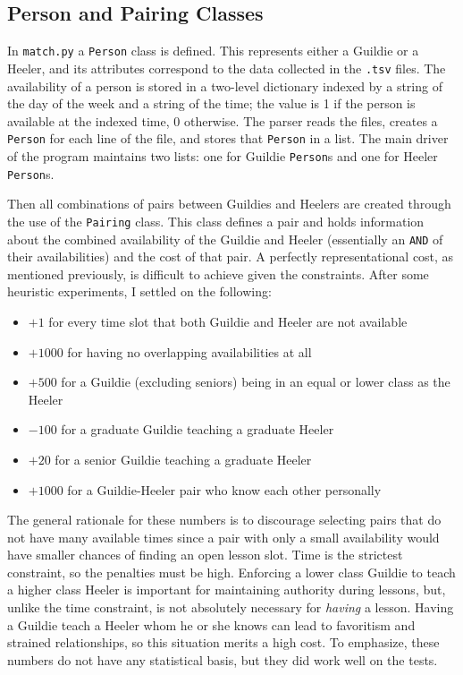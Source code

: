 \documentclass[letterpaper]{article}
\begin{document}
\subsection{Person and Pairing Classes}
In \texttt{match.py} a \texttt{Person} class is defined. This represents either a Guildie or a Heeler, and its
attributes correspond to the data collected in the \texttt{.tsv} files. The availability of a person is stored in
a two-level dictionary indexed by a string of the day of the week and a string of the time; the value is 1 if the person
is available at the indexed time, 0 otherwise. The parser reads the files, creates a
\texttt{Person} for each line of the file, and stores that \texttt{Person} in a list. The main driver of the program
maintains two lists: one for Guildie \texttt{Person}s and one for Heeler \texttt{Person}s.

Then all combinations of pairs between Guildies and Heelers are created through the use of the \texttt{Pairing} class. This class
defines a pair and holds information about the combined availability of the Guildie and Heeler (essentially an
\texttt{AND} of their availabilities) and the cost of that pair. A perfectly representational cost, as mentioned
previously, is difficult to achieve given the constraints. After some heuristic experiments, I settled on the following:

\begin{itemize}
    \item $+ 1$ for every time slot that both Guildie and Heeler are not available
    \item $+ 1000$ for having no overlapping availabilities at all
    \item $+ 500$ for a Guildie (excluding seniors) being in an equal or lower class as the Heeler
    \item $- 100$ for a graduate Guildie teaching a graduate Heeler
    \item $+ 20$ for a senior Guildie teaching a graduate Heeler
    \item $+ 1000$ for a Guildie-Heeler pair who know each other personally
\end{itemize}

The general rationale for these numbers is to discourage selecting pairs that do not have many available times since
a pair with only a small availability would have smaller chances of finding an open lesson slot. Time is the strictest
constraint, so the penalties must be high. Enforcing a lower class Guildie to teach a higher class Heeler is important
for maintaining authority during lessons, but, unlike the time constraint, is not absolutely necessary for
\textit{having} a lesson. Having a Guildie teach a Heeler whom he or she knows can lead to favoritism and strained
relationships, so this situation merits a high cost.
To emphasize, these numbers do not have any statistical basis, but they did work well on the
tests. 
\end{document}

